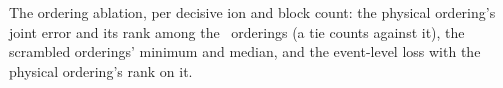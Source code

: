 \documentclass[aps,prl,twocolumn,superscriptaddress,nofootinbib,longbibliography]{revtex4-2}
\begin{document}
\begin{table}[p]
\centering
\caption{The ordering ablation, per decisive ion and block count: the
physical ordering's joint error and its rank among the \PBNOrderings\
orderings (a tie counts against it), the scrambled orderings' minimum
and median, and the event-level loss with the physical ordering's rank
on it.}
\label{tab:adjacency}

\end{table}



\end{document}
